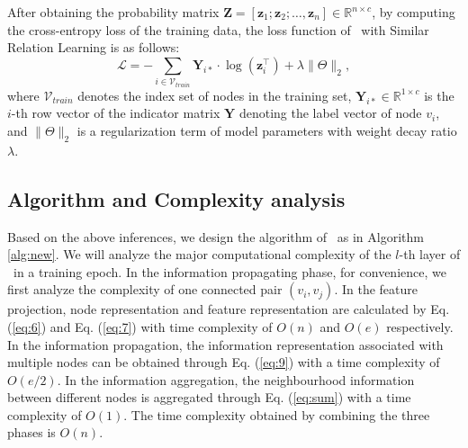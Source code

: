 After obtaining the probability matrix $\mathbf{Z} = [\mathbf{z}_{1}; \mathbf{z}_{2}; \dots , \mathbf{z}_{n}] \in \mathbb{R}^{n \times c}$, by computing the cross-entropy loss of the training data, the loss function of \alg\ with Similar Relation Learning is as follows: %
\begin{equation}
\mathcal{L}=-\sum_{i \in \mathcal{V}_{t r a i n}} \mathbf{Y}_{i *} \cdot \log \left(\mathbf{z}_i^{\top}\right) +\lambda\|\Theta\|_2,
\label{eq:loss}
\end{equation}
where $\mathcal{V}_{t r a i n}$ denotes the index set of nodes in the training set, $\mathbf{Y}_{i *} \in \mathbb{R}^{1 \times c}$ is the $i$-th row vector of the indicator matrix $\mathbf{Y}$ denoting the label vector of node $v_{i}$, and $\|\Theta\|_2$ is a regularization term of model parameters with weight decay ratio $\lambda$.



\subsection{Algorithm and Complexity analysis} \label{sec:IP}
Based on the above inferences,  we design the algorithm of \alg~as in Algorithm \ref{alg:new}. 
We will analyze the major computational complexity of the $l$-th layer of \alg\ in a training epoch. 
In the information propagating phase, for convenience, we first analyze the complexity of one connected pair $(v_{i}, v_{j})$. 
In the feature projection, node representation and feature representation are calculated by Eq. (\ref{eq:6}) and Eq. (\ref{eq:7}) with time complexity of $O(n)$ and $O(e)$ respectively. 
In the information propagation, the information representation associated with multiple nodes can be obtained through Eq. (\ref{eq:9}) with a time complexity of $O(e/2)$. 
In the information aggregation, the neighbourhood information between different nodes is aggregated through Eq. (\ref{eq:sum}) with a time complexity of $O(1)$. 
The time complexity obtained by combining the three phases is $O(n)$.

